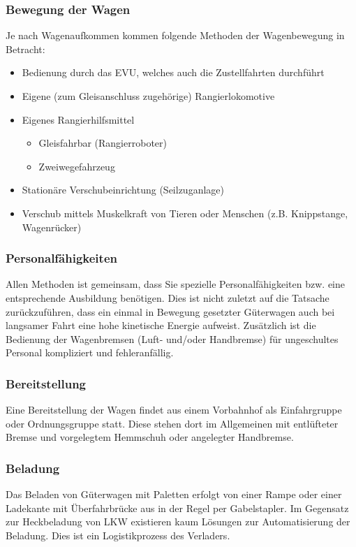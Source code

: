 \subsubsection{Bewegung der Wagen} \label{sec:BewdWagen}
Je nach Wagenaufkommen kommen folgende Methoden der Wagenbewegung in Betracht:
\begin{itemize}
	\item Bedienung durch das \acrshort{EVU}, welches auch die Zustellfahrten durchführt
	\item Eigene (zum \gls{Gleisanschluss} zugehörige) Rangierlokomotive
	\item Eigenes Rangierhilfsmittel
	\begin{itemize}
	    \item Gleisfahrbar (Rangierroboter)
	    \item Zweiwegefahrzeug
	\end{itemize}
	\item Stationäre Verschubeinrichtung (Seilzuganlage)
	\item Verschub mittels Muskelkraft von Tieren oder Menschen (z.B. Knippstange, Wagenrücker)
\end{itemize}
\subsubsection{Personalfähigkeiten}\label{sec:Personal}
Allen Methoden ist gemeinsam, dass Sie spezielle Personalfähigkeiten bzw. eine entsprechende Ausbildung benötigen. Dies ist nicht zuletzt auf die Tatsache zurückzuführen, dass ein einmal in Bewegung gesetzter Güterwagen auch bei langsamer Fahrt eine hohe kinetische Energie aufweist. Zusätzlich ist die Bedienung der Wagenbremsen (Luft- und/oder Handbremse) für ungeschultes Personal kompliziert und fehleranfällig.
\subsubsection{Bereitstellung}
Eine Bereitstellung der Wagen findet aus einem \gls{Vorbahnhof} als Einfahrgruppe oder Ordnungsgruppe statt. Diese stehen dort im Allgemeinen mit entlüfteter Bremse und vorgelegtem Hemmschuh oder angelegter Handbremse.
\subsubsection{Beladung}
Das Beladen von Güterwagen mit Paletten erfolgt von einer Rampe oder einer Ladekante mit Überfahrbrücke aus in der Regel per Gabelstapler. Im Gegensatz zur Heckbeladung von LKW existieren kaum Lösungen zur Automatisierung der Beladung. Dies ist ein Logistikprozess des Verladers.
